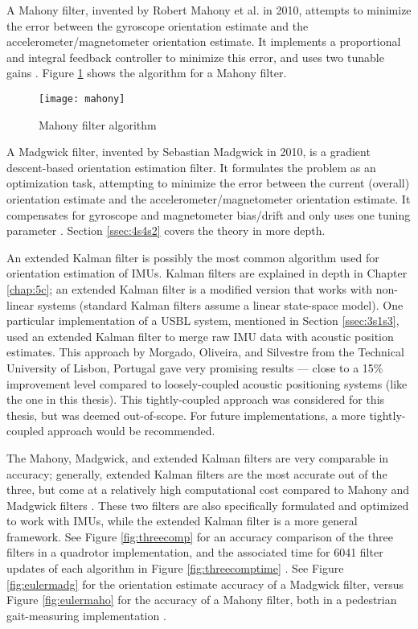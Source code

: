 \documentclass[11pt]{ucthesisCP}
\begin{document}
A Mahony filter, invented by Robert Mahony et al. in 2010, attempts to minimize the error between the gyroscope orientation estimate and the accelerometer/magnetometer orientation estimate. It implements a proportional and integral feedback controller to minimize this error, and uses two tunable gains \cite{mahony}. Figure \ref{fig:mahony} shows the algorithm for a Mahony filter.

\begin{figure}[htbp]
	\centering
	\texttt{[image: mahony]}
	\caption{Mahony filter algorithm \cite{ekfmadmah}}
	\label{fig:mahony}
\end{figure}

A Madgwick filter, invented by Sebastian Madgwick in 2010, is a gradient descent-based orientation estimation filter. It formulates the problem as an optimization task, attempting to minimize the error between the current (overall) orientation estimate and the accelerometer/magnetometer orientation estimate. It compensates for gyroscope and magnetometer bias/drift and only uses one tuning parameter \cite{madgwick}. Section \ref{ssec:4s4s2} covers the theory in more depth.

An extended Kalman filter is possibly the most common algorithm used for orientation estimation of IMUs. Kalman filters are explained in depth in Chapter \ref{chap:5c}; an extended Kalman filter is a modified version that works with non-linear systems (standard Kalman filters assume a linear state-space model). One particular implementation of a USBL system, mentioned in Section \ref{ssec:3s1s3}, used an extended Kalman filter to merge raw IMU data with acoustic position estimates. This approach by Morgado, Oliveira, and Silvestre from the Technical University of Lisbon, Portugal gave very promising results --- close to a 15\% improvement level compared to loosely-coupled acoustic positioning systems \cite{tightekf} (like the one in this thesis). This tightly-coupled approach was considered for this thesis, but was deemed out-of-scope. For future implementations, a more tightly-coupled approach would be recommended.

The Mahony, Madgwick, and extended Kalman filters are very comparable in accuracy; generally, extended Kalman filters are the most accurate out of the three, but come at a relatively high computational cost compared to Mahony and Madgwick filters \cite{madgwick} \cite{sfcomp}. These two filters are also specifically formulated and optimized to work with IMUs, while the extended Kalman filter is a more general framework. See Figure \ref{fig:threecomp} for an accuracy comparison of the three filters in a quadrotor implementation, and the associated time for 6041 filter updates of each algorithm in Figure \ref{fig:threecomptime} \cite{ekfmadmah}. See Figure \ref{fig:eulermadg} for the orientation estimate accuracy of a Madgwick filter, versus Figure \ref{fig:eulermaho} for the accuracy of a Mahony filter, both in a pedestrian gait-measuring implementation \cite{sfcomp}.
\end{document}
